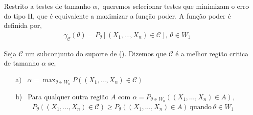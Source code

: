\documentclass[12pt]{beamer}
\begin{document}
\begin{frame}{}
\begin{block}{}
\justifying
Restrito a testes de tamanho $\alpha,$ queremos selecionar testes que minimizam o erro do tipo II, que é equivalente a maximizar a função poder. A função poder é definida por,
\begin{align*}
    \gamma_{\mathcal{C}}(\theta)=P_{\theta}[(X_{1},\ldots,X_{n})\in\mathcal{C}],~\theta\in W_{1}
\end{align*}
\end{block}
\end{frame}

\begin{frame}{}
\begin{definicao}
\justifying
Seja $\mathcal{C}$ um subconjunto do suporte de (\seqX). Dizemos que $\mathcal{C}$ é a melhor região critica de tamanho $\alpha$ se,
\begin{enumerate}
    \item[a)~] $\alpha=\max_{\theta\in W_{0}}P((X_{1},\ldots,X_{n})\in \mathcal{C})$
    \item[b)~] Para qualquer outra região $A$ com $\alpha=P_{\theta\in W_{0}}((X_{1},\ldots,X_{n})\in A),$
\begin{align*}
    P_{\theta}((X_{1},\ldots,X_{n})\in \mathcal{C})\geq P_{\theta}((X_{1},\ldots,X_{n})\in A)~\text{quando}~\theta\in W_{1}
\end{align*}
\end{enumerate}
\end{definicao}
\end{frame}
\end{document}
